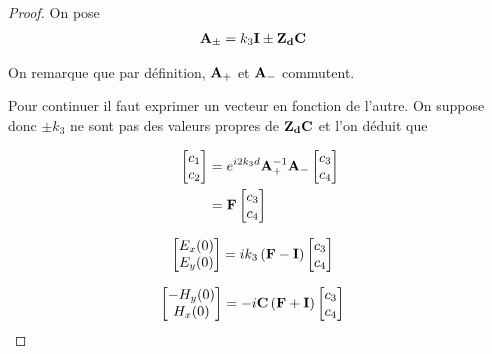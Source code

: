 \begin{proof}
            On pose
            \begin{align}
                \mathbf{A}_\pm &= k_3\mathbf{I} \pm \mathbf{Z_d}\mathbf{C}
            \end{align}

            On remarque que par définition, $\mathbf{A}_+$ et $\mathbf{A}_-$ commutent.

            Pour continuer il faut exprimer un vecteur en fonction de l'autre. On suppose donc $\pm k_3$ ne sont pas des valeurs propres de $\mathbf{Z_d}\mathbf{C}$ et l'on déduit que

            \begin{align}
                \begin{bmatrix}
                    c_1 \\
                    c_2
                \end{bmatrix}
                &= e^{i2 k_3 d} \mathbf{A}_+^{-1}\mathbf{A}_-
                \begin{bmatrix}
                    c_3 \\
                    c_4
                \end{bmatrix}
                \\
                & = \mathbf{F}
                \begin{bmatrix}
                    c_3 \\
                    c_4
                \end{bmatrix}
            \end{align}

            \begin{align}
                \begin{bmatrix}
                    E_x(0)\\
                    E_y(0)\\
                \end{bmatrix}
                &=ik_3\left(\mathbf{F} - \mathbf{I} \right)
                \begin{bmatrix}
                    c_3 \\
                    c_4
                \end{bmatrix}
            \end{align}

            \begin{align}
                \begin{bmatrix}
                    -H_y(0)\\
                    H_x(0)\\
                \end{bmatrix}
                &=-i\mathbf{C} \left(  \mathbf{F} + \mathbf{I}  \right)
                \begin{bmatrix}
                        c_3 \\
                        c_4
                \end{bmatrix}
            \end{align}


\end{proof}

